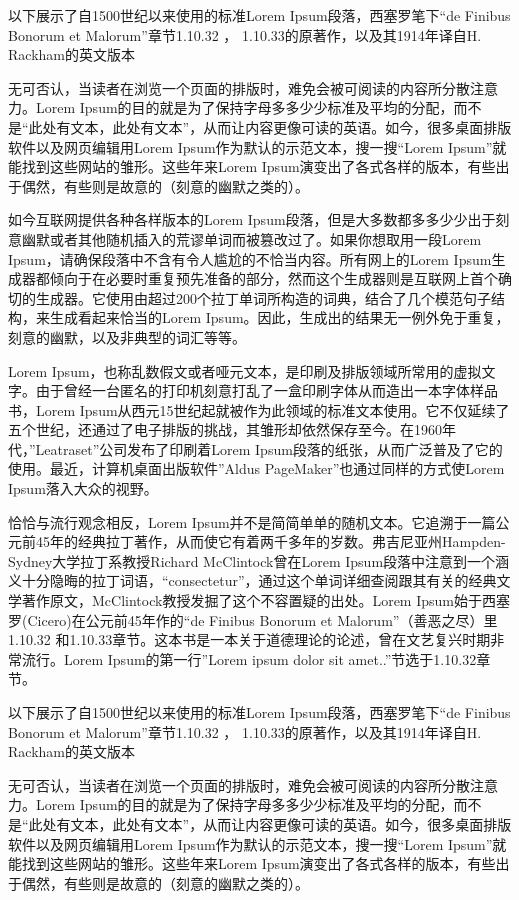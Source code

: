\documentclass[10pt,openany]{book}
\begin{document}
以下展示了自1500世纪以来使用的标准Lorem Ipsum段落，西塞罗笔下“de Finibus Bonorum et Malorum”章节1.10.32 ， 1.10.33的原著作，以及其1914年译自H. Rackham的英文版本

无可否认，当读者在浏览一个页面的排版时，难免会被可阅读的内容所分散注意力。Lorem Ipsum的目的就是为了保持字母多多少少标准及平均的分配，而不是“此处有文本，此处有文本”，从而让内容更像可读的英语。如今，很多桌面排版软件以及网页编辑用Lorem Ipsum作为默认的示范文本，搜一搜“Lorem Ipsum”就能找到这些网站的雏形。这些年来Lorem Ipsum演变出了各式各样的版本，有些出于偶然，有些则是故意的（刻意的幽默之类的）。

如今互联网提供各种各样版本的Lorem Ipsum段落，但是大多数都多多少少出于刻意幽默或者其他随机插入的荒谬单词而被篡改过了。如果你想取用一段Lorem Ipsum，请确保段落中不含有令人尴尬的不恰当内容。所有网上的Lorem Ipsum生成器都倾向于在必要时重复预先准备的部分，然而这个生成器则是互联网上首个确切的生成器。它使用由超过200个拉丁单词所构造的词典，结合了几个模范句子结构，来生成看起来恰当的Lorem Ipsum。因此，生成出的结果无一例外免于重复，刻意的幽默，以及非典型的词汇等等。

Lorem
Ipsum，也称乱数假文或者哑元文本，是印刷及排版领域所常用的虚拟文字。由于曾经一台匿名的打印机刻意打乱了一盒印刷字体从而造出一本字体样品书，Lorem
Ipsum从西元15世纪起就被作为此领域的标准文本使用。它不仅延续了五个世纪，还通过了电子排版的挑战，其雏形却依然保存至今。在1960年代，”Leatraset”公司发布了印刷着Lorem
Ipsum段落的纸张，从而广泛普及了它的使用。最近，计算机桌面出版软件”Aldus PageMaker”也通过同样的方式使Lorem
Ipsum落入大众的视野。

恰恰与流行观念相反，Lorem Ipsum并不是简简单单的随机文本。它追溯于一篇公元前45年的经典拉丁著作，从而使它有着两千多年的岁数。弗吉尼亚州Hampden-Sydney大学拉丁系教授Richard McClintock曾在Lorem Ipsum段落中注意到一个涵义十分隐晦的拉丁词语，“consectetur”，通过这个单词详细查阅跟其有关的经典文学著作原文，McClintock教授发掘了这个不容置疑的出处。Lorem Ipsum始于西塞罗(Cicero)在公元前45年作的“de Finibus Bonorum et Malorum”（善恶之尽）里1.10.32 和1.10.33章节。这本书是一本关于道德理论的论述，曾在文艺复兴时期非常流行。Lorem Ipsum的第一行”Lorem ipsum dolor sit amet..”节选于1.10.32章节。

以下展示了自1500世纪以来使用的标准Lorem Ipsum段落，西塞罗笔下“de Finibus Bonorum et Malorum”章节1.10.32 ， 1.10.33的原著作，以及其1914年译自H. Rackham的英文版本

无可否认，当读者在浏览一个页面的排版时，难免会被可阅读的内容所分散注意力。Lorem Ipsum的目的就是为了保持字母多多少少标准及平均的分配，而不是“此处有文本，此处有文本”，从而让内容更像可读的英语。如今，很多桌面排版软件以及网页编辑用Lorem Ipsum作为默认的示范文本，搜一搜“Lorem Ipsum”就能找到这些网站的雏形。这些年来Lorem Ipsum演变出了各式各样的版本，有些出于偶然，有些则是故意的（刻意的幽默之类的）。
\end{document}
